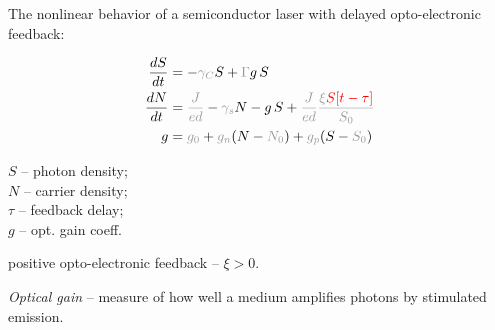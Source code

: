 \newcommand{\red}[1]{\textcolor{red}{#1}}
\newcommand{\grey}[1]{\textcolor{mygray}{#1}}


The nonlinear behavior of a semiconductor laser with delayed
opto-electronic feedback:
\begin{minipage}{0.62\textwidth}
    \begin{align*}
        \frac{d S}{d t} &= - \grey{\gamma_C} S + \grey{\Gamma} g\, S \\
        \frac{d N}{d t} &= \grey{\frac{J}{ed}}  -  \grey{\gamma_s} N - g\, S + 
        \grey{\frac{J}{ed} \frac{\xi \red{S [t- \tau]}}{S_0}}
         \\
         \vspace{5mm} g &= \grey{g_0} + \grey{g_n}(N-\grey{N_0}) + \grey{g_p}(S-\grey{S_0})
    \end{align*}
\end{minipage}
\hfill
\begin{minipage}{0.36\textwidth}
    $S$ -- photon density; \\
    $N$ -- carrier density; \\
    $\tau$ -- feedback delay; \\
    $g$ -- opt. gain coeff.
\end{minipage}
positive opto-electronic feedback -- $\xi > 0$. 

\phantom{42}

\textit{Optical gain} -- measure of how well a medium amplifies photons by stimulated emission.
